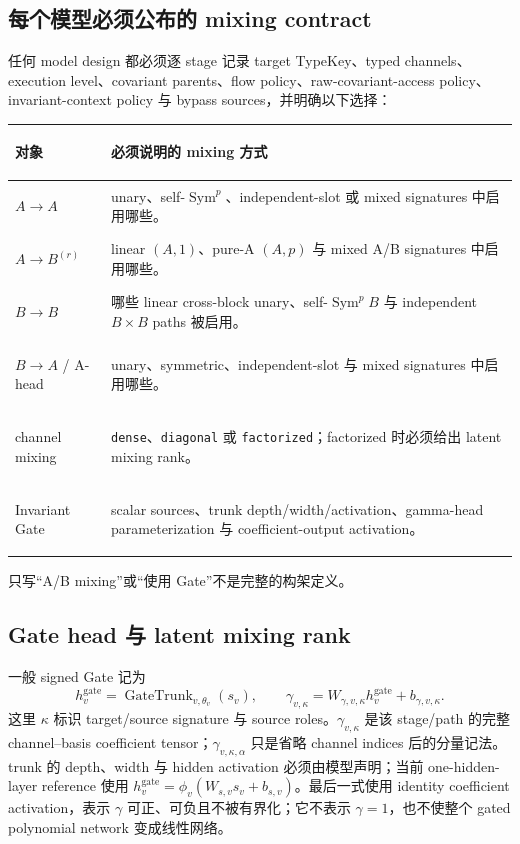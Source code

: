 \documentclass[11pt,a4paper,fontset=fandol]{ctexart}
\newcommand{\Sym}{\operatorname{Sym}}
\begin{document}
\subsection{每个模型必须公布的 mixing contract}

任何 model design 都必须逐 stage 记录 target TypeKey、typed channels、execution level、covariant parents、flow policy、raw-covariant-access policy、invariant-context policy 与 bypass sources，并明确以下选择：

\begin{center}
\small
\begin{tabularx}{\linewidth}{>{\bfseries\raggedright\arraybackslash}p{.23\linewidth}X}
\toprule
对象 & 必须说明的 mixing 方式 \\
\midrule
$A\to A$ & unary、self-$\Sym^p$、independent-slot 或 mixed signatures 中启用哪些。\\
$A\to B^{(r)}$ & linear $(A,1)$、pure-A $(A,p)$ 与 mixed A/B signatures 中启用哪些。\\
$B\to B$ & 哪些 linear cross-block unary、self-$\Sym^pB$ 与 independent $B\times B$ paths 被启用。\\
$B\to A$ / A-head & unary、symmetric、independent-slot 与 mixed signatures 中启用哪些。\\
channel mixing & \texttt{dense}、\texttt{diagonal} 或 \texttt{factorized}；factorized 时必须给出 latent mixing rank。\\
Invariant Gate & scalar sources、trunk depth/width/activation、gamma-head parameterization 与 coefficient-output activation。\\
\bottomrule
\end{tabularx}
\end{center}

只写“A/B mixing”或“使用 Gate”不是完整的构架定义。

\subsection{Gate head 与 latent mixing rank}

一般 signed Gate 记为
\begin{equation}
  h_v^{\mathrm{gate}}=\operatorname{GateTrunk}_{v,\theta_v}(s_v),
  \qquad
  \gamma_{v,\kappa}=W_{\gamma,v,\kappa}h_v^{\mathrm{gate}}+b_{\gamma,v,\kappa}.
  \label{eq:gate-head}
\end{equation}
这里 $\kappa$ 标识 target/source signature 与 source roles。$\gamma_{v,\kappa}$ 是该 stage/path 的完整 channel--basis coefficient tensor；$\gamma_{v,\kappa,\alpha}$ 只是省略 channel indices 后的分量记法。
trunk 的 depth、width 与 hidden activation 必须由模型声明；当前 one-hidden-layer reference 使用 $h_v^{\mathrm{gate}}=\phi_v(W_{s,v}s_v+b_{s,v})$。最后一式使用 identity coefficient activation，表示 $\gamma$ 可正、可负且不被有界化；它不表示 $\gamma=1$，也不使整个 gated polynomial network 变成线性网络。
\end{document}
